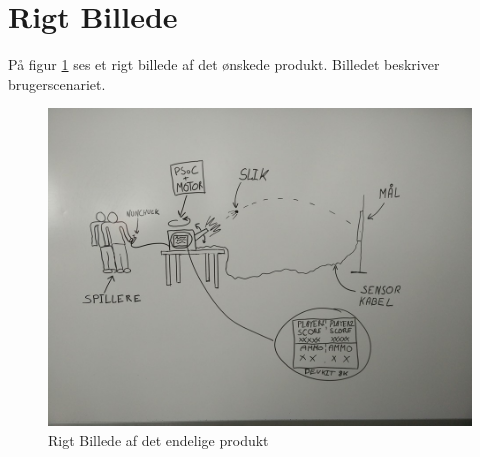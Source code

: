\section{Rigt Billede}

På figur \ref{ref:RigtBillede} ses et rigt billede af det ønskede produkt. Billedet beskriver brugerscenariet.

\begin{figure}[H]
	\centering
	\includegraphics[width=\textwidth]{Projektformulering/images/rigtBillede}
	\caption{Rigt Billede af det endelige produkt}
	\label{ref:RigtBillede}
\end{figure}



